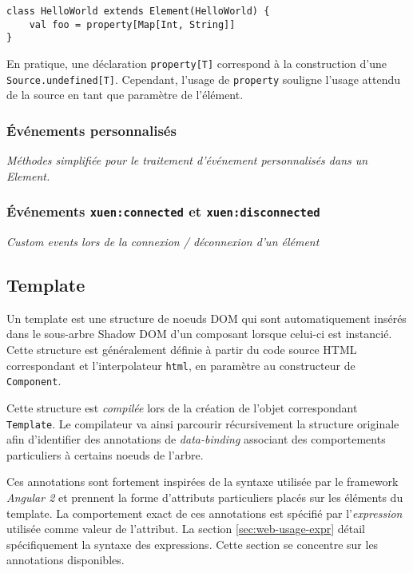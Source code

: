 \begin{lstlisting}
class HelloWorld extends Element(HelloWorld) {
	val foo = property[Map[Int, String]]
}
\end{lstlisting}

En pratique, une déclaration \texttt{property[T]} correspond à la construction d'une \texttt{Source.undefined[T]}. Cependant, l'usage de \texttt{property} souligne l'usage attendu de la source en tant que paramètre de l'élément.

\subsubsection{Événements personnalisés}

\textit{Méthodes simplifiée pour le traitement d'événement personnalisés dans un Element.}

\subsubsection{Événements \texttt{xuen:connected} et \texttt{xuen:disconnected}}

\textit{Custom events lors de la connexion / déconnexion d'un élément}

\subsection{Template}

Un template est une structure de noeuds DOM qui sont automatiquement insérés dans le sous-arbre Shadow DOM d'un composant lorsque celui-ci est instancié. Cette structure est généralement définie à partir du code source HTML correspondant et l'interpolateur \texttt{html}, en paramètre au constructeur de \texttt{Component}.

Cette structure est \emph{compilée} lors de la création de l'objet correspondant \texttt{Template}. Le compilateur va ainsi parcourir récursivement la structure originale afin d'identifier des annotations de \emph{data-binding} associant des comportements particuliers à certains noeuds de l'arbre.

Ces annotations sont fortement inspirées de la syntaxe utilisée par le framework \emph{Angular 2} et prennent la forme d'attributs particuliers placés sur les éléments du template. La comportement exact de ces annotations est spécifié par l'\emph{expression} utilisée comme valeur de l'attribut. La section \ref{sec:web-usage-expr} détail spécifiquement la syntaxe des expressions. Cette section se concentre sur les annotations disponibles.

